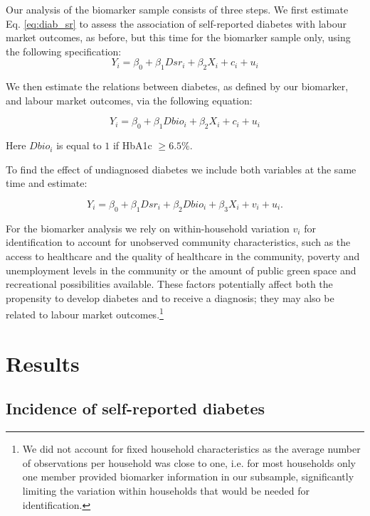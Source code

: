 Our analysis of the biomarker sample consists of three steps. We first estimate Eq. \ref{eq:diab_sr} to assess the association of self-reported diabetes with labour market outcomes, as before, but this time for the biomarker sample only, using the following specification:
\begin{equation}
Y_{i}=\beta_{0}+\beta_{1}Dsr_{i}+\beta_{2}X_{i}+c_{i}+u_{i}\label{eq:diab_sr}
\end{equation}

We then estimate the relations between diabetes, as defined by our biomarker, and labour market outcomes, via the following equation:

\begin{equation}
Y_{i}=\beta_{0}+\beta_{1}Dbio_{i}+\beta_{2}X_{i}+c_{i}+u_{i}\label{eq:diab}
\end{equation}

Here $Dbio_{i}$ is equal to $1$ if \ac{HbA1c} $\geq6.5\%$. 

To find the effect of undiagnosed diabetes we include both variables at the same time and estimate:

\begin{equation}
Y_{i}=\beta_{0}+\beta_{1}Dsr_{i}+\beta_{2}Dbio_{i}+\beta_{3}X_{i}+v_{i}+u_{i}.\label{eq:diab_ud}
\end{equation}

For the biomarker analysis we rely on within-household variation $v_{i}$ for identification to account for unobserved community characteristics, such as the access to healthcare and the quality of healthcare in the community, poverty and unemployment levels in the community or the amount of public green space and recreational possibilities available. These factors potentially affect both the propensity to develop diabetes and to receive a diagnosis; they may also be related to labour market outcomes.\footnote{We did not account for fixed household characteristics as the average number of observations per household was close to one, i.e. for most households only one member provided biomarker information in our subsample, significantly limiting the variation within households that would be needed for identification.}

\section{\label{sec:cha_4_results} Results}


\subsection{Incidence of self-reported diabetes}

